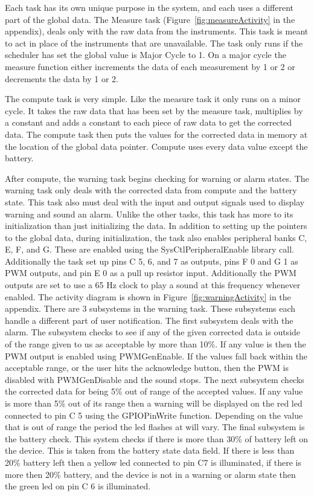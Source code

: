 \documentclass[12pt]{article} %
\begin{document}
Each task has its own unique purpose in the system, and each uses a different
part of the global data. The Measure task (Figure~\ref{fig:measureActivity} in the
appendix), deals only with the raw data from the instruments. This task is
meant to act in place of the instruments that are unavailable. The task only
runs if the scheduler has set the global value is Major Cycle to 1. On a major
cycle the measure function either increments the data of each measurement by 1
or 2 or decrements the data by 1 or 2.

The compute task is very simple. Like the measure task it only runs on a minor
cycle. It takes the raw data that has been set by the measure task, multiplies
by a constant and adds a constant to each piece of raw data to get the
corrected data. The compute task then puts the values for the corrected data in
memory at the location of the global data pointer. Compute uses every data
value except the battery.

After compute, the warning task begins checking for warning or alarm states. The
warning task only deals with the corrected data from compute and the battery
state. This task also must deal with the input and output signals used to
display warning and sound an alarm. Unlike the other tasks, this task has more
to its initialization than just initializing the data. In addition to setting
up the pointers to the global data, during initialization, the task also
enables peripheral banks C, E, F, and G. These are enabled using the
SysCtlPeripheralEnable library call. Additionally the task set up pins C 5, 6,
and 7 as outputs, pins F 0 and G 1 as PWM outputs, and pin E 0 as a pull up
resistor input. Additionally the PWM outputs are set to use a 65 Hz clock to play
a sound at this frequency whenever enabled. The activity diagram is shown in
Figure~\ref{fig:warningActivity} in the appendix. There are 3 subsystems in the
warning task. These subsystems each handle a different part of user
notification. The first subsystem deals with the alarm. The subsystem checks to
see if any of the given corrected data is outside of the range given to us as
acceptable by more than 10\%. If any value is then the PWM output is enabled
using PWMGenEnable. If the values fall back within the acceptable range, or the
user hits the acknowledge button, then the PWM is disabled with PWMGenDisable
and the sound stops. The next subsystem checks the corrected data for being 5\%
out of range of the accepted values. If any value is more than 5\% out of its
range then a warning will be displayed on the red led connected to pin C 5
using the GPIOPinWrite function. Depending on the value that is out of range
the period the led flashes at will vary. The final subsystem is the battery
check. This system checks if there is more than 30\% of battery left on the
device. This is taken from the battery state data field. If there is less than
20\% battery left then a yellow led connected to pin C7 is illuminated, if
there is more then 20\% battery, and the device is not in a warning or alarm
state then the green led on pin C 6 is illuminated. 
\end{document}
